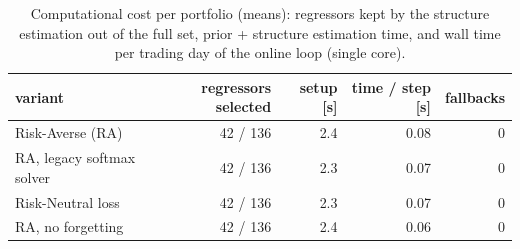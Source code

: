 \begin{table}[ht!]
\centering
\small
\setlength{\tabcolsep}{4pt}
\begin{tabular}{lrrrr}
\hline
variant & regressors selected & setup [s] & time / step [s] & fallbacks \\
\hline
Risk-Averse (RA) & 42 / 136 & 2.4 & 0.08 & 0 \\
RA, legacy softmax solver & 42 / 136 & 2.3 & 0.07 & 0 \\
Risk-Neutral loss & 42 / 136 & 2.3 & 0.07 & 0 \\
RA, no forgetting & 42 / 136 & 2.4 & 0.06 & 0 \\
\hline
\end{tabular}
\caption{Computational cost per portfolio (means): regressors kept by the structure estimation out of the full set, prior + structure estimation time, and wall time per trading day of the online loop (single core).}
\label{tab:runtime_oos2026}
\end{table}
